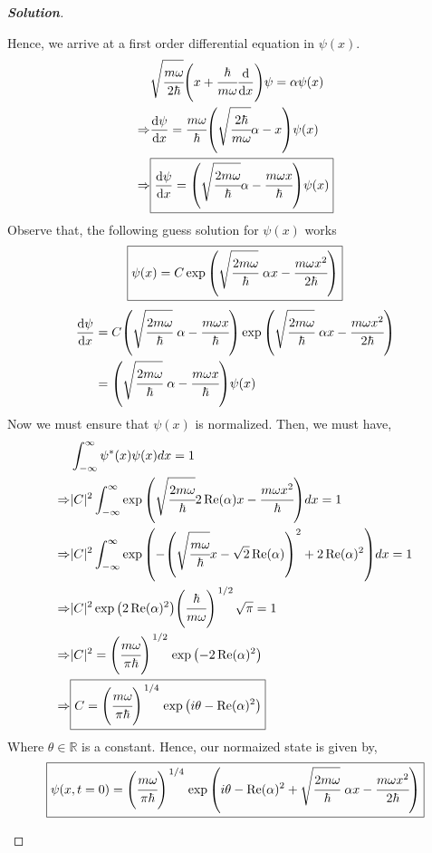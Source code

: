 \documentclass[10pt]{scrartcl}
\theoremstyle{definition}
\newenvironment{solution} {\begin{proof}[\normalfont \textbf{Solution}]} {\end{proof}}
\newcommand{\rn}{\mathbb{R}}
\begin{document}
\begin{solution}
\begin{enumerate}[label=(\alph*)]
            Hence, we arrive at a first order differential equation in $\psi(x)$.
            \begin{align*}
                &\sqrt{\cfrac{m\omega}{2\hbar}}\qty(x + \cfrac{\hbar}{m\omega} \dv{x})\psi = \alpha \psi(x) \\
                \Rightarrow &\dv{\psi}{x} = \cfrac{m\omega}{\hbar}\qty(\sqrt{\cfrac{2\hbar}{m\omega}}\alpha - x)\psi(x) \\
                \Rightarrow &\boxed{\dv{\psi}{x} = \qty(\sqrt{\cfrac{2m\omega}{\hbar}}\alpha - \cfrac{m\omega x}{\hbar})\psi(x)} \\
            \end{align*}
            Observe that, the following guess solution for $\psi(x)$ works
            $$\boxed{\psi(x) = C\exp\qty(\sqrt{\cfrac{2m\omega}{\hbar}}~\alpha x - \cfrac{m\omega x^2}{2\hbar})}$$
            \begin{align*}
                \dv{\psi}{x} &= C\qty(\sqrt{\cfrac{2m\omega}{\hbar}}~\alpha - \cfrac{m\omega x}{\hbar}) \exp\qty(\sqrt{\cfrac{2m\omega}{\hbar}}~\alpha x - \cfrac{m\omega x^2}{2\hbar}) \\ 
                             &= \qty(\sqrt{\cfrac{2m\omega}{\hbar}}~\alpha - \cfrac{m\omega x}{\hbar})\psi(x)
            \end{align*}
            Now we must ensure that $\psi(x)$ is normalized. Then, we must have, 
            \begin{align*}
                &\int_{-\infty}^\infty \psi^*(x)\psi(x)dx = 1 \\ 
                \Rightarrow &|C|^2 \int_{-\infty}^\infty \exp\qty(\sqrt{\cfrac{2m\omega}{\hbar}}2\Re(\alpha)x - \cfrac{m\omega x^2}{\hbar} )dx  = 1\\ 
                \Rightarrow &|C|^2 \int_{-\infty}^\infty \exp\qty(-\qty(\sqrt{\cfrac{m\omega}{\hbar}}x - \sqrt 2\Re(\alpha))^2 + 2\Re(\alpha)^2)dx  = 1\\ 
                \Rightarrow &|C|^2 \exp\qty(2\Re(\alpha)^2) \qty(\cfrac{\hbar}{m\omega})^{\flatfrac{1}{2}} \sqrt\pi = 1 \\
                \Rightarrow &|C|^2 = \qty(\cfrac{m\omega}{\pi\hbar})^{\flatfrac{1}{2}} \exp\qty(-2\Re(\alpha)^2) \\
                \Rightarrow &\boxed{C = \qty(\cfrac{m\omega}{\pi\hbar})^{\flatfrac{1}{4}} \exp\qty(i\theta -\Re(\alpha)^2)}
            \end{align*}
            Where $\theta \in \rn$ is a constant. Hence, our normaized state is given by, 
            $$\boxed{\psi(x, t=0) = \qty(\cfrac{m\omega}{\pi\hbar})^{\flatfrac{1}{4}}\exp\qty(i\theta -\Re(\alpha)^2 + \sqrt{\cfrac{2m\omega}{\hbar}}~\alpha x - \cfrac{m\omega x^2}{2\hbar})}$$
    \end{enumerate}
\end{solution}
\end{document}
